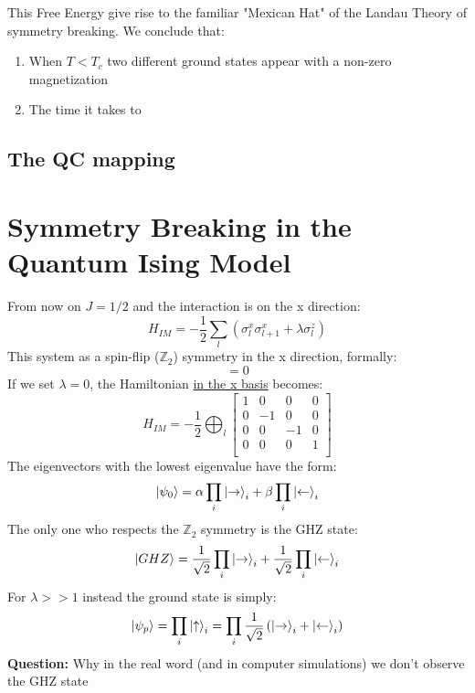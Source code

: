 \documentclass[12pt,a4paper]{article}
\begin{document}
This Free Energy give rise to the familiar "Mexican Hat" of the Landau Theory of symmetry breaking.
We conclude that:
\begin{enumerate}
	\item When $T<T_c$ two different ground states appear with a non-zero magnetization
	\item The time it takes to
\end{enumerate}

\subsection{The QC mapping}




\section{Symmetry Breaking in the Quantum Ising Model}
From now on $J=1/2$ and the interaction is on the x direction:
\begin{equation}
	H_{IM}=-\frac{1}{2} \sum_{l}\left(\sigma_{l}^{x} \sigma_{l+1}^{x}+\lambda\sigma_{l}^{z}\right)
\end{equation}
This system as a spin-flip ($\mathbb{Z}_2$)	symmetry in the x direction, formally:
\begin{equation}
	[H,\otimes_i \sigma^z_i]=0
\end{equation}
If we set $\lambda=0$, the Hamiltonian \underline{in the x basis} becomes:
\begin{equation}
	H_{IM}=-\frac{1}{2} \bigoplus_l \left[\begin{array}{cccc}
		1 & 0 & 0 & 0 \\
		0 & -1 & 0 & 0 \\
		0 & 0 & -1 & 0 \\
		0 & 0 & 0 & 1 \\
	\end{array}\right]
\end{equation}
The eigenvectors with the lowest eigenvalue have the form:
\begin{equation}
	\ket{\psi_0}=\alpha\prod_i\ket{\rightarrow}_i + \beta\prod_i\ket{\leftarrow}_i
\end{equation}
The only one who respects the $\mathbb{Z}_2$ symmetry is the GHZ state:
\begin{equation}
	\ket{GHZ}=\frac{1}{\sqrt{2}}\prod_i\ket{\rightarrow}_i +\frac{1}{\sqrt{2}} \prod_i\ket{\leftarrow}_i
\end{equation}
For $\lambda>>1$ instead the ground state is simply:
\begin{equation}
	\ket{\psi_p}=\prod_i\ket{\uparrow}_i = \prod_i\frac{1}{\sqrt{2}}\left(\ket{\rightarrow}_i+\ket{\leftarrow}_i\right)
\end{equation}
\textbf{Question:} Why in the real word (and in computer simulations) we don't observe the GHZ state 
 
\end{document}
